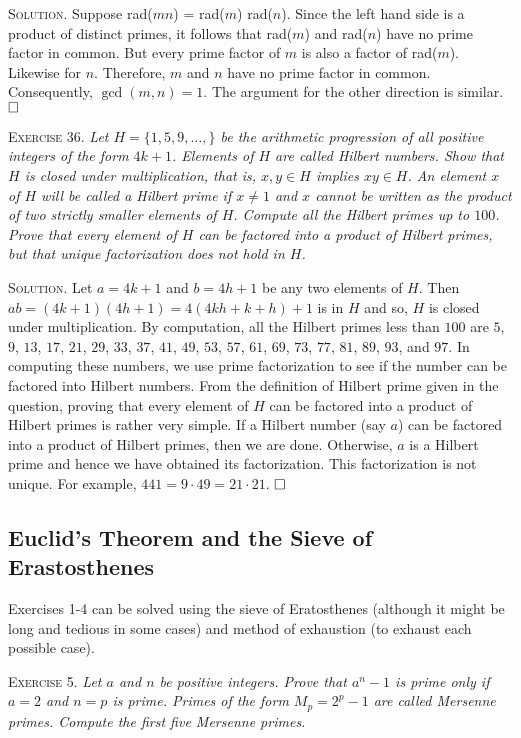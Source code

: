 \documentclass[11pt, leqno]{article}
\newcommand{\done}{\ensuremath{\hfill\square}}
\begin{document}
\textsc{Solution}. Suppose rad($mn$) = rad($m$) rad($n$). Since the left hand side is a product of distinct primes, it follows that rad($m$) and rad($n$) have no prime factor in common. But every prime factor of $m$ is also a factor of rad($m$). Likewise for $n$. Therefore, $m$ and $n$ have no prime factor in common. Consequently, $\gcd(m,n) = 1$. The argument for the other direction is similar. \done

\textsc{Exercise 36}. \emph{Let $H = \{1, 5, 9, \ldots,\}$ be the arithmetic progression of all positive integers of the form $4k + 1$. Elements of $H$ are called Hilbert numbers. Show that $H$ is closed under multiplication, that is, $x, y \in H$ implies $xy \in H$. An element $x$ of $H$ will be called a Hilbert prime if $x\ne 1$ and $x$ cannot be written as the product of two strictly smaller elements of $H$. Compute all the Hilbert primes up to $100$. Prove that every element of $H$ can be factored into a product of Hilbert primes, but that unique factorization does not hold in $H$.}

\textsc{Solution}. Let $a = 4k + 1$ and $b = 4h + 1$ be any two elements of $H$. Then $ab = (4k + 1)(4h + 1) = 4(4kh + k + h) + 1$ is in $H$ and so, $H$ is closed under multiplication. By computation, all the Hilbert primes less than $100$ are $5$, $9$, $13$, $17$, $21$, $29$, $33$, $37$, $41$, $49$, $53$, $57$, $61$, $69$, $73$, $77$, $81$, $89$, $93$, and $97$. In computing these numbers, we use prime factorization to see if the number can be factored into Hilbert numbers. From the definition of Hilbert prime given in the question, proving that every element of $H$ can be factored into a product of Hilbert primes is rather very simple. If a Hilbert number (say $a$) can be factored into a product of Hilbert primes, then we are done. Otherwise, $a$ is a Hilbert prime and hence we have obtained its factorization. This factorization is not unique. For example, $441 = 9 \cdot 49 = 21 \cdot 21$. \done

\subsection{Euclid's Theorem and the Sieve of Erastosthenes}

Exercises 1-4 can be solved using the sieve of Eratosthenes (although it might be long and tedious in some cases) and method of exhaustion (to exhaust each possible case).

\textsc{Exercise 5}. \emph{Let $a$ and $n$ be positive integers. Prove that $a^n-1$ is prime only if $a=2$ and $n=p$ is prime. Primes of the form $M_p = 2^p - 1$ are called Mersenne primes. Compute the first five Mersenne primes.}
\end{document}
